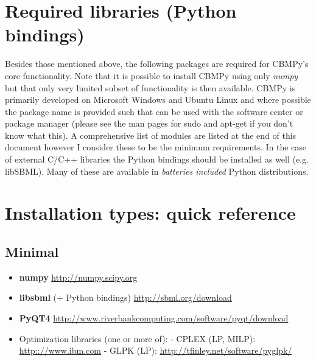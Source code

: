 \documentclass[a4paper,11pt,english]{sphinxmanual}
\begin{document}
\section{Required libraries (Python bindings)}
\label{install_doc:required-libraries-python-bindings}
Besides those mentioned above, the following packages are required for CBMPy's
core functionality. Note that it is possible to install CBMPy using only
\emph{numpy} but that only very limited subset of functionality is then available.
CBMPy is primarily developed on Microsoft Windows and Ubuntu Linux and where possible the package
name is provided such that can be used with the software center or package manager
 (please see the man pages for sudo and apt-get
if you don't know what this). A comprehensive list of modules are listed at the end of this
document however I consider these to be the minimum requirements. In the case of
external C/C++ libraries the Python bindings should be installed as well (e.g. libSBML). Many
of these are available in \emph{batteries included} Python distributions.


\section{Installation types: quick reference}
\label{install_doc:installation-types-quick-reference}

\subsection{Minimal}
\label{install_doc:minimal}\begin{itemize}
\item {} 
\textbf{numpy} \href{http://numpy.scipy.org}{http://numpy.scipy.org}

\item {} 
\textbf{libsbml} (+ Python bindings) \href{http://sbml.org/download}{http://sbml.org/download}

\item {} 
\textbf{PyQT4} \href{http://www.riverbankcomputing.com/software/pyqt/download}{http://www.riverbankcomputing.com/software/pyqt/download}

\item {} 
Optimization libraries (one or more of):
- CPLEX (LP, MILP): \href{http:://www.ibm.com}{http:://www.ibm.com}
- GLPK  (LP): \href{http://tfinley.net/software/pyglpk/}{http://tfinley.net/software/pyglpk/}

\end{itemize}
\end{document}

